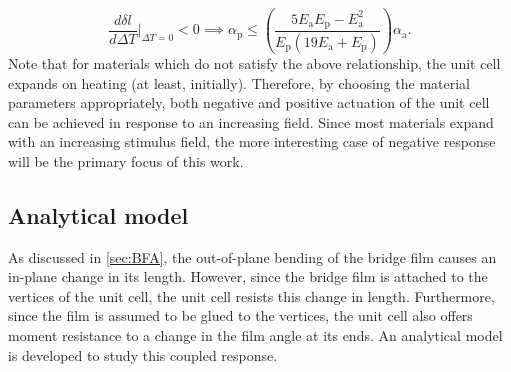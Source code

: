 \documentclass[final,times,5p]{elsarticle}
\numberwithin{equation}{section}
\begin{document}
\begin{equation}
    \frac{d\delta l}{d \Delta T}\bigg|_{\Delta T=0}<0\implies\alpha_\mathrm{p} \leq \left(\frac{5 E_\mathrm{a} E_\mathrm{p} - E_\mathrm{a}^2}{E_\mathrm{p} (19 E_\mathrm{a} + E_\mathrm{p})}\right) \alpha_\mathrm{a}.
\end{equation}
Note that for materials which do not satisfy the above relationship, the unit cell expands on heating (at least, initially). Therefore, by choosing the material parameters appropriately, both negative and positive actuation of the unit cell can be achieved in response to an increasing field. Since most materials expand with an increasing stimulus field, the more interesting case of negative response will be the primary focus of this work.






\subsection{Analytical model}
As discussed in \cref{sec:BFA}, the out-of-plane bending of the bridge film causes an in-plane change in its length. However, since the bridge film is attached to the vertices of the unit cell, the unit cell resists this change in length. Furthermore, since the film is assumed to be glued to the vertices, the unit cell also offers moment resistance to a change in the film angle at its ends. An analytical model is developed to study this coupled response. 
\end{document}
